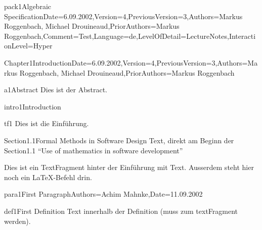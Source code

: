 \documentclass[landscape, slides, light]{mmiss2}
\begin{document}
\begin{Package}{pack1}{Algebraic
Specification}{Date=6.09.2002,Version=4,PreviousVersion=3,Authors={Markus
Roggenbach, Michael Drouineaud},PriorAuthors={Markus
Roggenbach},Comment=Test,Language=de,LevelOfDetail=LectureNotes,InteractionLevel=Hyper}


\begin{Section}{Chapter1}{Introduction}{Date=6.09.2002,Version=4,PreviousVersion=3,Authors={Markus
Roggenbach, Michael Drouineaud},PriorAuthors={Markus Roggenbach}}
\begin{Abstract}[]{a1}{Abstract}{}
  Dies ist der Abstract.
  \end{Abstract}\begin{Introduction}[]{intro1}{Introduction}{}
    \begin{TextFragment}[Latex]{tf1}{}
    Dies ist die Einf\"uhrung.
    \end{TextFragment}
  \end{Introduction}

  \begin{Section}{Section1.1}{Formal Methods in Software Design}{}
  Text, direkt am Beginn der Section1.1 
  ``Use of mathematics in software development''\\
  \begin{TextFragment}[]{}{}
  Dies ist ein TextFragment hinter der Einf\"uhrung mit
   Text. Ausserdem steht hier noch
  ein \LaTeX{}-Befehl drin.
  \end{TextFragment}
  \begin{Paragraph}[]{para1}{First Paragraph}{Authors=Achim Mahnke,Date=11.09.2002}
    \begin{Definition}[]{def1}{First Definition}{}
      Text innerhalb der Definition (muss zum textFragment werden).


\end{Definition}
\end{Paragraph}
\end{Section}
\end{Section}
\end{Package}
\end{document}
